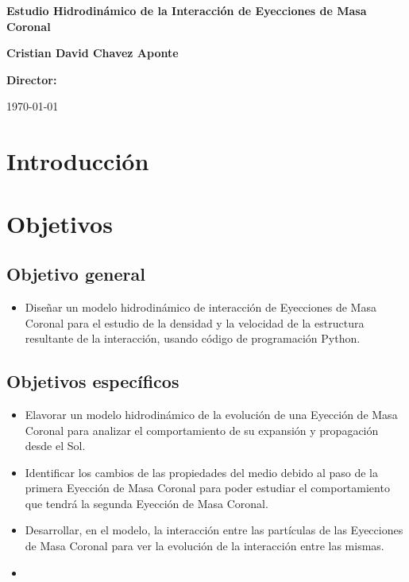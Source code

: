 






\begin{center}
  \vspace*{0cm}
  {\Huge \textbf{{Estudio Hidrodinámico de la Interacción de Eyecciones de Masa Coronal}} \par}
  \vspace{1cm}
{{
\large \par \textbf{{Cristian David Chavez Aponte}} \par}

 \large \textbf{Director:} \par \tutor \par}
  \vspace{1cm}
  {\Large \universidad \par}
  \vspace{0.5cm}
  {\large \facultad \par}
  \vspace{0.5cm}
  {\large \lugar \par}
  \vspace{0.5cm}
  {\large \today}
\end{center}


\section{Introducción}


\section{Objetivos}

\subsection{Objetivo general}
\begin{itemize}
\item Diseñar un modelo hidrodinámico de interacción de Eyecciones de Masa Coronal para el estudio de la densidad y la velocidad de la estructura resultante de la interacción, usando código de programación Python.
\end{itemize}
\subsection{Objetivos específicos}
\begin{itemize}
\item Elavorar un modelo hidrodinámico de la evolución de una Eyección de Masa Coronal para analizar el comportamiento de su expansión y propagación desde el Sol.
\item Identificar los cambios de las propiedades del medio debido al paso de la primera Eyección de Masa Coronal para poder estudiar el comportamiento que tendrá la segunda Eyección de Masa Coronal.
\item Desarrollar, en el modelo, la interacción entre las partículas de las Eyecciones de Masa Coronal para ver la evolución de la interacción entre las mismas.
\item 
\end{itemize}



